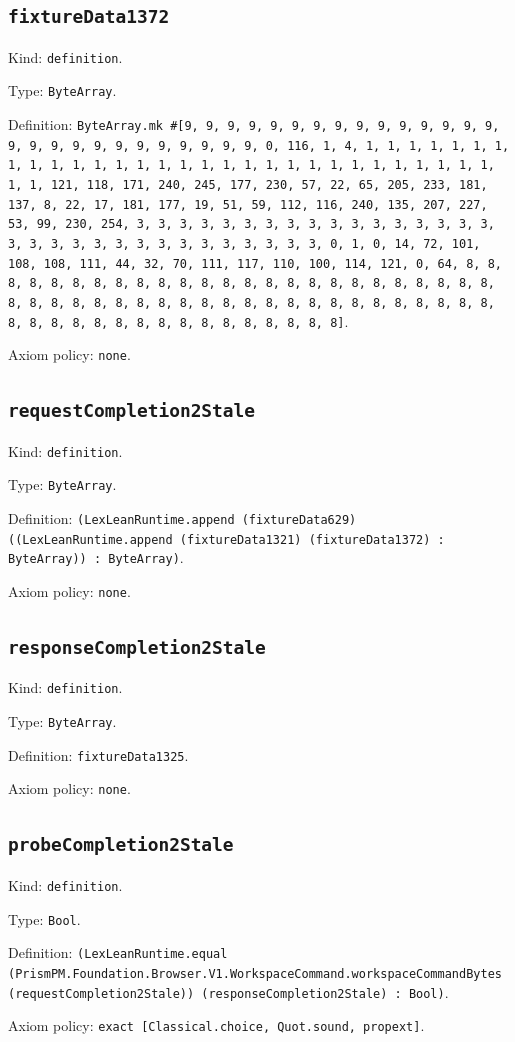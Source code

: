 \documentclass[11pt]{article}
\begin{document}
\subsection*{\texttt{fixtureData1372}}
\noindent Kind: \texttt{definition}.\par
\noindent Type: \texttt{ByteArray}.\par
\noindent Definition: \texttt{ByteArray.mk \#[9, 9, 9, 9, 9, 9, 9, 9, 9, 9, 9, 9, 9, 9, 9, 9, 9, 9, 9, 9, 9, 9, 9, 9, 9, 9, 9, 0, 116, 1, 4, 1, 1, 1, 1, 1, 1, 1, 1, 1, 1, 1, 1, 1, 1, 1, 1, 1, 1, 1, 1, 1, 1, 1, 1, 1, 1, 1, 1, 1, 1, 1, 1, 121, 118, 171, 240, 245, 177, 230, 57, 22, 65, 205, 233, 181, 137, 8, 22, 17, 181, 177, 19, 51, 59, 112, 116, 240, 135, 207, 227, 53, 99, 230, 254, 3, 3, 3, 3, 3, 3, 3, 3, 3, 3, 3, 3, 3, 3, 3, 3, 3, 3, 3, 3, 3, 3, 3, 3, 3, 3, 3, 3, 3, 3, 3, 3, 0, 1, 0, 14, 72, 101, 108, 108, 111, 44, 32, 70, 111, 117, 110, 100, 114, 121, 0, 64, 8, 8, 8, 8, 8, 8, 8, 8, 8, 8, 8, 8, 8, 8, 8, 8, 8, 8, 8, 8, 8, 8, 8, 8, 8, 8, 8, 8, 8, 8, 8, 8, 8, 8, 8, 8, 8, 8, 8, 8, 8, 8, 8, 8, 8, 8, 8, 8, 8, 8, 8, 8, 8, 8, 8, 8, 8, 8, 8, 8, 8, 8, 8, 8]}.\par
\noindent Axiom policy: \texttt{none}.\par
\subsection*{\texttt{requestCompletion2Stale}}
\noindent Kind: \texttt{definition}.\par
\noindent Type: \texttt{ByteArray}.\par
\noindent Definition: \texttt{(LexLeanRuntime.append (fixtureData629) ((LexLeanRuntime.append (fixtureData1321) (fixtureData1372) : ByteArray)) : ByteArray)}.\par
\noindent Axiom policy: \texttt{none}.\par
\subsection*{\texttt{responseCompletion2Stale}}
\noindent Kind: \texttt{definition}.\par
\noindent Type: \texttt{ByteArray}.\par
\noindent Definition: \texttt{fixtureData1325}.\par
\noindent Axiom policy: \texttt{none}.\par
\subsection*{\texttt{probeCompletion2Stale}}
\noindent Kind: \texttt{definition}.\par
\noindent Type: \texttt{Bool}.\par
\noindent Definition: \texttt{(LexLeanRuntime.equal (PrismPM.Foundation.Browser.V1.WorkspaceCommand.workspaceCommandBytes (requestCompletion2Stale)) (responseCompletion2Stale) : Bool)}.\par
\noindent Axiom policy: \texttt{exact [Classical.choice, Quot.sound, propext]}.\par
\end{document}
